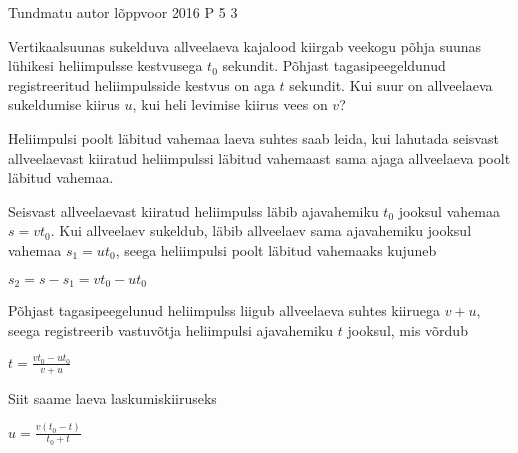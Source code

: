 {Tundmatu autor} %
{lõppvoor} %
{2016} %
{P 5} %
{3} %
{

\ifStatement
Vertikaalsuunas sukelduva allveelaeva kajalood kiirgab veekogu põhja suunas lühikesi heliimpulsse kestvusega $t_0$ sekundit. Põhjast tagasipeegeldunud registreeritud heliimpulsside kestvus on aga $t$ sekundit. Kui suur on allveelaeva sukeldumise kiirus $u$, kui heli levimise kiirus vees on $v$?
\fi

\ifHint
Heliimpulsi poolt läbitud vahemaa laeva suhtes saab leida, kui lahutada seisvast allveelaevast kiiratud heliimpulssi läbitud vahemaast sama ajaga allveelaeva poolt läbitud vahemaa.
\fi


\ifSolution
Seisvast allveelaevast kiiratud heliimpulss läbib ajavahemiku $t_0$ jooksul vahemaa $s = vt_0$. Kui allveelaev sukeldub, läbib allveelaev sama ajavahemiku jooksul vahemaa $s_1=ut_0$, seega heliimpulsi poolt läbitud vahemaaks kujuneb
\begin{center}
$s_2 = s - s_1 = vt_0 - ut_0$
\end{center}
Põhjast tagasipeegelunud heliimpulss liigub allveelaeva suhtes kiiruega $v + u$, seega registreerib vastuvõtja heliimpulsi ajavahemiku $t$ jooksul, mis võrdub 
\begin{center}
$t = \frac{vt_0 - ut_0}{v + u}$
\end{center}
Siit saame laeva laskumiskiiruseks
\begin{center}
$u = \frac{v(t_0 - t)}{t_0 + t}$
\end{center}
\fi
}
